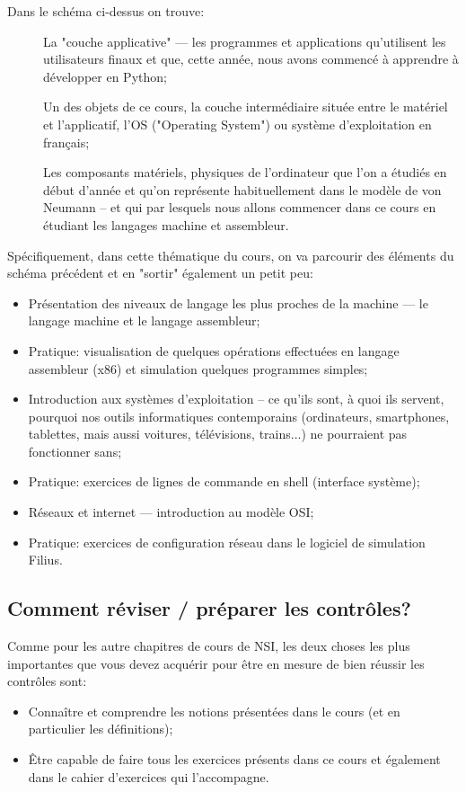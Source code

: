 \documentclass[12pt]{article}
\begin{document}
	Dans le schéma ci-dessus on trouve:
	\begin{description}
		\item[] La "couche applicative" --- les programmes et applications qu'utilisent les utilisateurs finaux et que, cette année, nous avons commencé à apprendre à développer en Python;
		\item[] Un des objets de ce cours, la couche intermédiaire située entre le matériel et l'applicatif, l'OS ("Operating System") ou système d'exploitation en français;
		\item[] Les composants matériels, physiques de l'ordinateur que l'on a étudiés en début d'année et qu'on représente habituellement dans le modèle de von Neumann -- et qui par lesquels nous allons commencer dans ce cours en étudiant les langages machine et assembleur.
	\end{description}
	

	Spécifiquement, dans cette thématique du cours, on va parcourir des éléments du schéma précédent et en "sortir" également un petit peu:
	\begin{itemize}
		\item Présentation des niveaux de langage les plus proches de la machine --- le langage machine et le langage assembleur;
		\item Pratique: visualisation de quelques opérations effectuées en langage assembleur (x86) et simulation quelques programmes simples;
		\item Introduction aux systèmes d'exploitation -- ce qu'ils sont, à quoi ils servent, pourquoi nos outils informatiques contemporains (ordinateurs, smartphones, tablettes, mais aussi voitures, télévisions, trains...) ne pourraient pas fonctionner sans;
		\item Pratique: exercices de lignes de commande en shell (interface système);
		\item Réseaux et internet --- introduction au modèle OSI;
		\item Pratique: exercices de configuration réseau dans le logiciel de simulation Filius.
	\end{itemize}

	\subsection{Comment réviser / préparer les contrôles?}
	
	Comme pour les autre chapitres de cours de NSI, les deux choses les plus importantes que vous devez acquérir pour être en mesure de bien réussir les contrôles sont:
	\begin{itemize}
		\item Connaître et comprendre les notions présentées dans le cours (et en particulier les définitions);
		\item Être capable de faire tous les exercices présents dans ce cours et également dans le cahier d'exercices qui l'accompagne.
	\end{itemize}
	 
\end{document}

